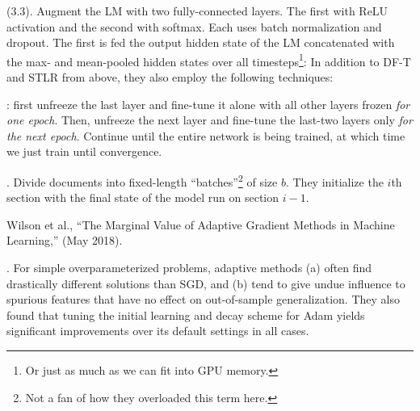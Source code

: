 \documentclass[11pt]{article}
\renewcommand\vec[2][]{\bm{#2}_{#1}}
\newcommand\myspace[1][]{\vspace{#1\bigskipamount}}
\newcommand\p{\Needspace{10\baselineskip} \noindent}
\begin{document}
\myspace
\p {} (3.3). Augment the LM with two fully-connected layers. The first with ReLU activation and the second with softmax. Each uses batch normalization and dropout. The first is fed the output hidden state of the LM concatenated with the max- and mean-pooled hidden states over all timesteps\footnote{Or just as much as we can fit into GPU memory.}:
\graybox{
	\vec[c]{h} &= \left[ 
		\vec[t]{h}, \text{maxpool}(\matr H), \text{meanpool}(\matr H)
	\right]
}
In addition to DF-T and STLR from above, they also employ the following techniques:
\begin{compactitem}
	\item  {}: first unfreeze the last layer and fine-tune it alone with all other layers frozen \textit{for one epoch}. Then, unfreeze the next layer and fine-tune the last-two layers only \textit{for the next epoch}. Continue until the entire network is being trained, at which time we just train until convergence.
	\item {}. Divide documents into fixed-length ``batches''\footnote{Not a fan of how they overloaded this term here.} of size $b$. They initialize the $i$th section with the final state of the model run on section $i -1$. 
\end{compactitem}














\vspace{-1em}
{\footnotesize Wilson et al., ``The Marginal Value of Adaptive Gradient Methods in Machine Learning,'' (May 2018).}


\p {}. For simple overparameterized problems, adaptive methods (a) often find drastically different solutions than SGD, and (b) tend to give undue influence to spurious features that have no effect on out-of-sample generalization. They also found that tuning the initial learning and decay scheme for Adam yields significant improvements over its default settings in all cases.
\end{document}

